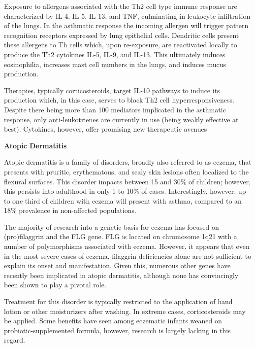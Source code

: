 \documentclass[11pt,letterpaper,final] {article}
\begin{document}
Exposure to allergens associated with the Th2 cell type immune response are characterized by IL-4, IL-5, IL-13, and TNF, culminating in leukocyte infiltration of the lungs. In the asthmatic response the incoming allergen will trigger pattern recognition receptors expressed by lung epithelial cells. Dendritic cells present these allergens to Th cells which, upon re-exposure, are reactivated locally to produce the Th2 cytokines IL-5, IL-9, and IL-13. This ultimately induces eosinophilia, increases mast cell numbers in the lungs, and induces mucus production.

Therapies, typically corticosteroids, target IL-10 pathways to induce its production which, in this case, serves to block Th2 cell hyperresponsiveness. Despite there being more than 100 mediators implicated in the asthmatic response, only anti-leukotrienes are currently in use (being weakly effective at best). Cytokines, however, offer promising new therapeutic avenues

\clearpage

\begin{center}
	{\bfseries Atopic Dermatitis}
\end{center}

Atopic dermatitis is a family of disorders, broadly also referred to as eczema, that presents with pruritic, erythematous, and scaly skin lesions often localized to the flexural surfaces. This disorder impacts between 15 and 30\% of children; however, this persists into adulthood in only 1 to 10\% of cases. Interestingly, however, up to one third of children with eczema will present with asthma, compared to an 18\% prevalence in non-affected populations.

The majority of research into a genetic basis for eczema has focused on (pro)filaggrin and the FLG gene. FLG is located on chromosome 1q21 with a number of polymorphisms associated with eczema. However, it appears that even in the most severe cases of eczema, filaggrin deficiencies alone are not sufficient to explain its onset and manifestation. Given this, numerous other genes have recently been implicated in atopic dermatitis, although none has convincingly been shown to play a pivotal role.

Treatment for this disorder is typically restricted to the application of hand lotion or other moisturizers after washing. In extreme cases, corticosteroids may be applied. Some benefits have seen among eczematic infants weaned on probiotic-supplemented formula, however, research is largely lacking in this regard.

\clearpage


\nocite{*}
\end{document}
